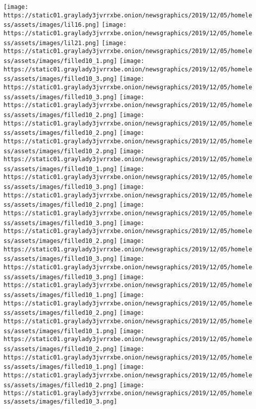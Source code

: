\texttt{[image: https://static01.graylady3jvrrxbe.onion/newsgraphics/2019/12/05/homeless/assets/images/lil16.png]}
\texttt{[image: https://static01.graylady3jvrrxbe.onion/newsgraphics/2019/12/05/homeless/assets/images/lil21.png]}
\texttt{[image: https://static01.graylady3jvrrxbe.onion/newsgraphics/2019/12/05/homeless/assets/images/filled10\_1.png]}
\texttt{[image: https://static01.graylady3jvrrxbe.onion/newsgraphics/2019/12/05/homeless/assets/images/filled10\_3.png]}
\texttt{[image: https://static01.graylady3jvrrxbe.onion/newsgraphics/2019/12/05/homeless/assets/images/filled10\_3.png]}
\texttt{[image: https://static01.graylady3jvrrxbe.onion/newsgraphics/2019/12/05/homeless/assets/images/filled10\_2.png]}
\texttt{[image: https://static01.graylady3jvrrxbe.onion/newsgraphics/2019/12/05/homeless/assets/images/filled10\_2.png]}
\texttt{[image: https://static01.graylady3jvrrxbe.onion/newsgraphics/2019/12/05/homeless/assets/images/filled10\_2.png]}
\texttt{[image: https://static01.graylady3jvrrxbe.onion/newsgraphics/2019/12/05/homeless/assets/images/filled10\_1.png]}
\texttt{[image: https://static01.graylady3jvrrxbe.onion/newsgraphics/2019/12/05/homeless/assets/images/filled10\_3.png]}
\texttt{[image: https://static01.graylady3jvrrxbe.onion/newsgraphics/2019/12/05/homeless/assets/images/filled10\_2.png]}
\texttt{[image: https://static01.graylady3jvrrxbe.onion/newsgraphics/2019/12/05/homeless/assets/images/filled10\_3.png]}
\texttt{[image: https://static01.graylady3jvrrxbe.onion/newsgraphics/2019/12/05/homeless/assets/images/filled10\_2.png]}
\texttt{[image: https://static01.graylady3jvrrxbe.onion/newsgraphics/2019/12/05/homeless/assets/images/filled10\_3.png]}
\texttt{[image: https://static01.graylady3jvrrxbe.onion/newsgraphics/2019/12/05/homeless/assets/images/filled10\_3.png]}
\texttt{[image: https://static01.graylady3jvrrxbe.onion/newsgraphics/2019/12/05/homeless/assets/images/filled10\_1.png]}
\texttt{[image: https://static01.graylady3jvrrxbe.onion/newsgraphics/2019/12/05/homeless/assets/images/filled10\_2.png]}
\texttt{[image: https://static01.graylady3jvrrxbe.onion/newsgraphics/2019/12/05/homeless/assets/images/filled10\_1.png]}
\texttt{[image: https://static01.graylady3jvrrxbe.onion/newsgraphics/2019/12/05/homeless/assets/images/filled10\_2.png]}
\texttt{[image: https://static01.graylady3jvrrxbe.onion/newsgraphics/2019/12/05/homeless/assets/images/filled10\_1.png]}
\texttt{[image: https://static01.graylady3jvrrxbe.onion/newsgraphics/2019/12/05/homeless/assets/images/filled10\_2.png]}
\texttt{[image: https://static01.graylady3jvrrxbe.onion/newsgraphics/2019/12/05/homeless/assets/images/filled10\_3.png]}

